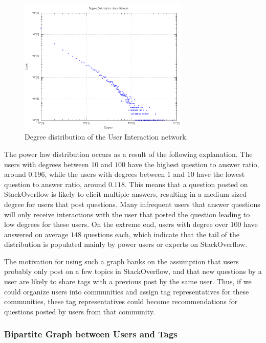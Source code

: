\documentclass[10pt]{IEEEtran}
\begin{document}
\begin{figure}[h]
  \centering
    \includegraphics[width=3.2in]{user_degdistr.png}
  \caption{Degree distribution of the User Interaction network.}
  \label{fig:user_dd}
\end{figure}

The power law distribution occurs as a result of the following explanation. The users with degrees between $10$ and $100$ have the highest question to answer ratio, around $0.196$, while the users with degrees between $1$ and $10$ have the lowest question to answer ratio, around $0.118$. This means that a question posted on StackOverflow is likely to elicit multiple answers, resulting in a medium sized degree for users that post questions. Many infrequent users that answer questions will only receive interactions with the user that posted the question leading to low degrees for these users. On the extreme end, users with degree over $100$ have answered on average $148$ questions each, which indicate that the tail of the distribution is populated mainly by power users or experts on StackOverflow.

The motivation for using such a graph banks on the assumption that users probably only post on a few topics in StackOverflow, and that new questions by a user are likely to share tags with a previous post by the same user. Thus, if we could organize users into communities and assign tag representatives for these communities, these tag representatives could become recommendations for questions posted by users from that community.

\subsubsection{Bipartite Graph between Users and Tags}
\end{document}
